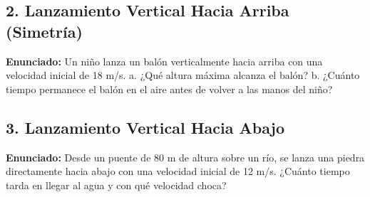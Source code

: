 \documentclass[12pt, letterpaper]{article}
\begin{document}
	
	\subsection*{2. Lanzamiento Vertical Hacia Arriba (Simetría)}
	\noindent \textbf{Enunciado:} Un niño lanza un balón verticalmente hacia arriba con una velocidad inicial de 18 m/s. a. ¿Qué altura máxima alcanza el balón? b. ¿Cuánto tiempo permanece el balón en el aire antes de volver a las manos del niño?
	
	
	\subsection*{3. Lanzamiento Vertical Hacia Abajo}
	\noindent \textbf{Enunciado:} Desde un puente de 80 m de altura sobre un río, se lanza una piedra directamente hacia abajo con una velocidad inicial de 12 m/s. ¿Cuánto tiempo tarda en llegar al agua y con qué velocidad choca?
	
\end{document}
